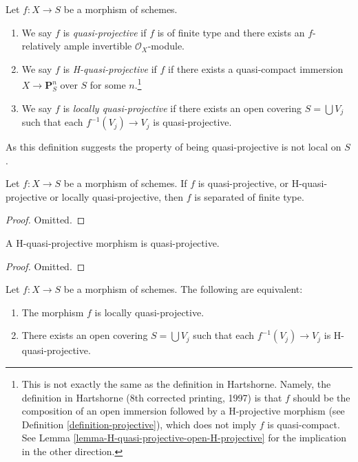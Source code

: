 \begin{definition}
\label{definition-quasi-projective}
Let $f : X \to S$ be a morphism of schemes.
\begin{enumerate}
\item We say $f$ is {\it quasi-projective} if $f$ is of finite type
and there exists an $f$-relatively ample invertible $\mathcal{O}_X$-module.
\item We say $f$ is {\it H-quasi-projective} if $f$ if there exists
a quasi-compact immersion $X \to \mathbf{P}^n_S$ over $S$ for some
$n$.\footnote{This is not exactly the same as the definition in Hartshorne.
Namely, the definition in Hartshorne (8th corrected printing, 1997) is that
$f$ should be the composition of an open immersion followed by a H-projective
morphism (see Definition \ref{definition-projective}), which does not imply
$f$ is quasi-compact. See
Lemma \ref{lemma-H-quasi-projective-open-H-projective} for
the implication in the other direction.}
\item We say $f$ is {\it locally quasi-projective} if there exists
an open covering $S = \bigcup V_j$ such that each $f^{-1}(V_j) \to V_j$
is quasi-projective.
\end{enumerate}
\end{definition}

\noindent
As this definition suggests the property of being quasi-projective
is not local on $S$.

\begin{lemma}
\label{lemma-quasi-projective-properties}
Let $f : X \to S$ be a morphism of schemes. If $f$ is quasi-projective,
or H-quasi-projective or locally quasi-projective, then $f$ is
separated of finite type.
\end{lemma}

\begin{proof}
Omitted.
\end{proof}

\begin{lemma}
\label{lemma-H-quasi-projective-quasi-projective}
A H-quasi-projective morphism is quasi-projective.
\end{lemma}

\begin{proof}
Omitted.
\end{proof}

\begin{lemma}
\label{lemma-characterize-locally-quasi-projective}
Let $f : X \to S$ be a morphism of schemes.
The following are equivalent:
\begin{enumerate}
\item The morphism $f$ is locally quasi-projective.
\item There exists an open covering $S = \bigcup V_j$ such
that each $f^{-1}(V_j) \to V_j$ is H-quasi-projective.
\end{enumerate}
\end{lemma}

